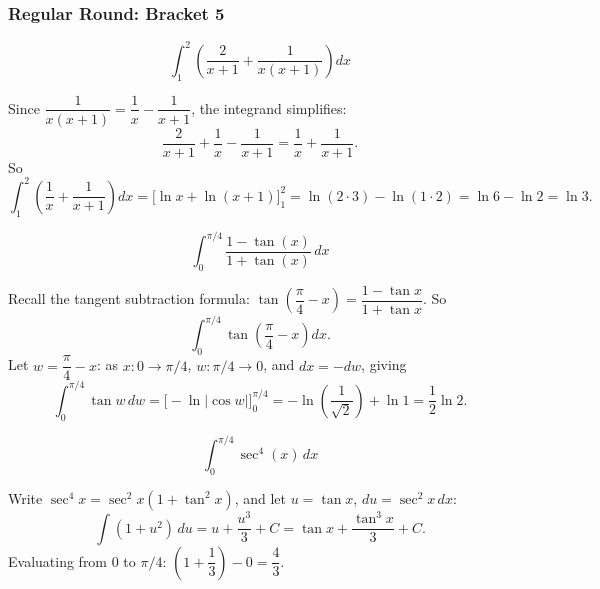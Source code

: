 \subsubsection*{Regular Round: Bracket 5}
\begin{questions}

\question \[\int_1^2 \left(\frac{2}{x+1}+\frac{1}{x(x+1)}\right)dx\]
\begin{solution}
Since $\dfrac{1}{x(x+1)}=\dfrac1x-\dfrac1{x+1}$, the integrand simplifies:
\[
\frac{2}{x+1}+\frac1x-\frac1{x+1}=\frac1x+\frac1{x+1}.
\]
So
\[
\int_1^2\left(\frac1x+\frac1{x+1}\right)dx=\Big[\ln x+\ln(x+1)\Big]_1^2=\ln(2\cdot3)-\ln(1\cdot2)=\ln6-\ln2=\ln3.
\]
\end{solution}

\question \[\int_0^{\pi/4} \frac{1-\tan(x)}{1+\tan(x)}\,dx\]
\begin{solution}
Recall the tangent subtraction formula: $\tan\!\left(\dfrac\pi4-x\right)=\dfrac{1-\tan x}{1+\tan x}$. So
\[
\int_0^{\pi/4}\tan\!\left(\frac\pi4-x\right)dx.
\]
Let $w=\dfrac\pi4-x$: as $x:0\to\pi/4$, $w:\pi/4\to0$, and $dx=-dw$, giving
\[
\int_0^{\pi/4}\tan w\,dw=\Big[-\ln|\cos w|\Big]_0^{\pi/4}=-\ln\!\left(\frac{1}{\sqrt2}\right)+\ln1=\frac12\ln2.
\]
\end{solution}

\question \[\int_0^{\pi/4} \sec^4(x)\,dx\]
\begin{solution}
Write $\sec^4x=\sec^2x(1+\tan^2x)$, and let $u=\tan x$, $du=\sec^2x\,dx$:
\[
\int(1+u^2)\,du=u+\frac{u^3}{3}+C=\tan x+\frac{\tan^3x}{3}+C.
\]
Evaluating from $0$ to $\pi/4$: $\left(1+\dfrac13\right)-0=\dfrac43$.
\end{solution}

\end{questions}

